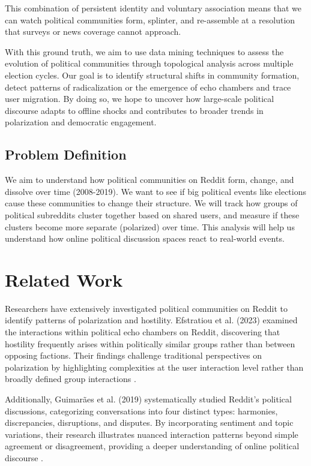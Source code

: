 \documentclass{article}
\begin{document}
This combination of persistent identity and voluntary association means that we can watch political communities form, splinter, and re-assemble at a resolution that surveys or news coverage cannot approach.

With this ground truth, we aim to use data mining techniques to assess the evolution of political communities through topological analysis across multiple election cycles. Our goal is to identify structural shifts in community formation, detect patterns of radicalization or the emergence of echo chambers and trace user migration. By doing so, we hope to uncover how large-scale political discourse adapts to offline shocks and contributes to broader trends in polarization and democratic engagement.


\subsection{Problem Definition}
We aim to understand how political communities on Reddit form, change, and dissolve over time (2008-2019). We want to see if big political events like elections cause these communities to change their structure. We will track how groups of political subreddits cluster together based on shared users, and measure if these clusters become more separate (polarized) over time. This analysis will help us understand how online political discussion spaces react to real-world events.

\section{Related Work}

Researchers have extensively investigated political communities on Reddit to identify patterns of polarization and hostility. Efstratiou et al. (2023) examined the interactions within political echo chambers on Reddit, discovering that hostility frequently arises within politically similar groups rather than between opposing factions. Their findings challenge traditional perspectives on polarization by highlighting complexities at the user interaction level rather than broadly defined group interactions \cite{efstratiou2023non}.

Additionally, Guimarães et al. (2019) systematically studied Reddit’s political discussions, categorizing conversations into four distinct types: harmonies, discrepancies, disruptions, and disputes. By incorporating sentiment and topic variations, their research illustrates nuanced interaction patterns beyond simple agreement or disagreement, providing a deeper understanding of online political discourse \cite{guimaraes2019analyzing}.
\end{document}
